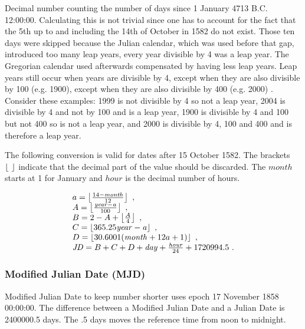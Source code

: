 Decimal number counting the number of days since 1 January 4713 B.C.
12:00:00. Calculating this is not trivial since one has to account for
the fact that the 5th up to and including the 14th of October in 1582 do
not exist. Those ten days were skipped because the Julian calendar,
which was used before that gap, introduced too many leap years, every
year divisible by 4 was a leap year. The Gregorian calendar used
afterwards compensated by having less leap years. Leap years still occur
when years are divisible by 4, except when they are also divisible by
100 (e.g. 1900), except when they are also divisible by 400 (e.g. 2000)
\cite{acf:2014aa}. Consider these examples: 1999 is not divisible by 4
so not a leap year, 2004 is divisible by 4 and not by 100 and is a leap
year, 1900 is divisible by 4 and 100 but not 400 so is not a leap year,
and 2000 is divisible by 4, 100 and 400 and is therefore a leap year.

The following conversion is valid for dates after 15 October 1582. The
brackets $\left \lfloor \  \right \rfloor$ indicate that the decimal part of the value should
be discarded. The $\mathit{month}$ starts at 1 for January and
$\mathit{hour}$ is the decimal number of hours.

\begin{equation}
    \begin{array}{l}
        a = \left \lfloor \frac{14 - \mathit{month}}{12} \right \rfloor \ , \\
        A = \left \lfloor \frac{\mathit{year - a}}{100} \right \rfloor \ , \\
        B = 2 - A + \left \lfloor \frac{A}{4} \right \rfloor \ , \\
        C = \left \lfloor 365.25 \mathit{year - a} \right \rfloor \ , \\
        D = \left \lfloor 30.6001 (\mathit{month} + 12 a + 1) \right \rfloor \ , \\
        \mathit{JD} = B + C + D + \mathit{day} +
                      \frac{\mathit{hour}}{24} + 1720994.5 \ .
    \end{array}
\end{equation}


\subsubsection{Modified Julian Date (MJD)}

Modified Julian Date to keep number shorter uses epoch 17 November 1858
00:00:00. The difference between a Modified Julian Date and a Julian
Date is 2400000.5 days. The .5 days moves the reference time from noon
to midnight.

